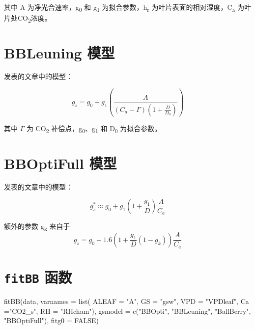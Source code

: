 \documentclass[
]{krantz}
\makeatletter
\newenvironment{Shaded}{\begin{snugshade}}{\end{snugshade}}
\newcommand{\AttributeTok}[1]{\textcolor[rgb]{0.77,0.63,0.00}{#1}}
\newcommand{\ConstantTok}[1]{\textcolor[rgb]{0.00,0.00,0.00}{#1}}
\newcommand{\FunctionTok}[1]{\textcolor[rgb]{0.00,0.00,0.00}{#1}}
\newcommand{\NormalTok}[1]{#1}
\newcommand{\StringTok}[1]{\textcolor[rgb]{0.31,0.60,0.02}{#1}}
\newenvironment{kframe}{%
\medskip{}
\setlength{\fboxsep}{.8em}
 \def\at@end@of@kframe{}%
 \ifinner\ifhmode%
  \def\at@end@of@kframe{\end{minipage}}%
  \begin{minipage}{\columnwidth}%
 \fi\fi%
 \def\FrameCommand##1{\hskip\@totalleftmargin \hskip-\fboxsep
 \colorbox{shadecolor}{##1}\hskip-\fboxsep
     \hskip-\linewidth \hskip-\@totalleftmargin \hskip\columnwidth}%
 \MakeFramed {\advance\hsize-\width
   \@totalleftmargin\z@ \linewidth\hsize
   \@setminipage}}%
 {\par\unskip\endMakeFramed%
 \at@end@of@kframe}
\renewenvironment{Shaded}{\begin{kframe}}{\end{kframe}}
\makeatother
\begin{document}
其中 A 为净光合速率，g\textsubscript{0} 和 g\textsubscript{1} 为拟合参数，h\textsubscript{r} 为叶片表面的相对湿度，C\textsubscript{a} 为叶片处CO\textsubscript{2}浓度。

\hypertarget{bbleuning}{%
\section{BBLeuning 模型}\label{bbleuning}}

\citet{leuning1995a} 发表的文章中的模型：

\begin{equation}
g_s = g_0 + g_1(\frac{A}{(C_a - \Gamma)(1 + \frac{D}{D_0})})
\label{eq:BBLeuning}
\end{equation}

其中 \(\Gamma\) 为 CO\textsubscript{2} 补偿点，g\textsubscript{0}、g\textsubscript{1} 和 D\textsubscript{0} 为拟合参数。

\hypertarget{bboptifull}{%
\section{BBOptiFull 模型}\label{bboptifull}}

\citet{Medlyn2011Reconciling} 发表的文章中的模型：

\begin{equation}
g_s^* \approx g_0 + g_1(1 + \frac{g_1}{D}) \frac{A}{C_a}
\label{eq:BBOptiFull}
\end{equation}

额外的参数 g\textsubscript{k} 来自于 \citet{Duursma2013Near}
\begin{equation}
g_s = g_0 + 1.6(1 + \frac{g_1}{D}(1-g_k)) \frac{A}{C_a}
\label{eq:Duursm}
\end{equation}

\hypertarget{fitbb-p}{%
\section{\texorpdfstring{\texttt{fitBB} 函数}{fitBB 函数}}\label{fitbb-p}}

\begin{Shaded}
\begin{Highlighting}[]
\FunctionTok{fitBB}\NormalTok{(data, }\AttributeTok{varnames =} \FunctionTok{list}\NormalTok{(}
  \AttributeTok{ALEAF =} \StringTok{"A"}\NormalTok{, }\AttributeTok{GS =} \StringTok{"gsw"}\NormalTok{, }\AttributeTok{VPD =} \StringTok{"VPDleaf"}\NormalTok{,}
  \AttributeTok{Ca =}\StringTok{"CO2\_s"}\NormalTok{, }\AttributeTok{RH =} \StringTok{"RHcham"}\NormalTok{), }
  \AttributeTok{gsmodel =} \FunctionTok{c}\NormalTok{(}\StringTok{"BBOpti"}\NormalTok{, }\StringTok{"BBLeuning"}\NormalTok{, }\StringTok{"BallBerry"}\NormalTok{,}
              \StringTok{"BBOptiFull"}\NormalTok{), }\AttributeTok{fitg0 =} \ConstantTok{FALSE}\NormalTok{)}
\end{Highlighting}
\end{Shaded}
\end{document}
